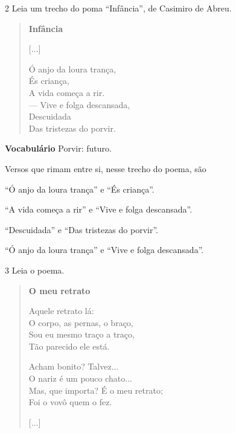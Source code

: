\num{2} Leia um trecho do poma ``Infância'', de Casimiro de Abreu.

\begin{verse}
\textbf{Infância}

{[}...{]}

Ó anjo da loura trança,\\
És criança,\\
A vida começa a rir.\\
--- Vive e folga descansada,\\
Descuidada\\
Das tristezas do porvir.
\end{verse}


\textbf{Vocabulário}
Porvir: futuro.

Versos que rimam entre si, nesse trecho do poema, são

\begin{escolha}
\item ``Ó anjo da loura trança'' e ``És criança''.

\item ``A vida começa a rir'' e ``Vive e folga descansada''.

\item ``Descuidada'' e ``Das tristezas do porvir''.

\item ``Ó anjo da loura trança'' e ``Vive e folga descansada''.
\end{escolha}

\num{3} Leia o poema.

\begin{verse}
\textbf{O meu retrato}

Aquele retrato lá:\\
O corpo, as pernas, o braço,\\
Sou eu mesmo traço a traço,\\
Tão parecido ele está.

Acham bonito? Talvez...\\
O nariz é um pouco chato...\\
Mas, que importa? É o meu retrato;\\
Foi o vovô quem o fez.

{[}...{]}
\end{verse}


